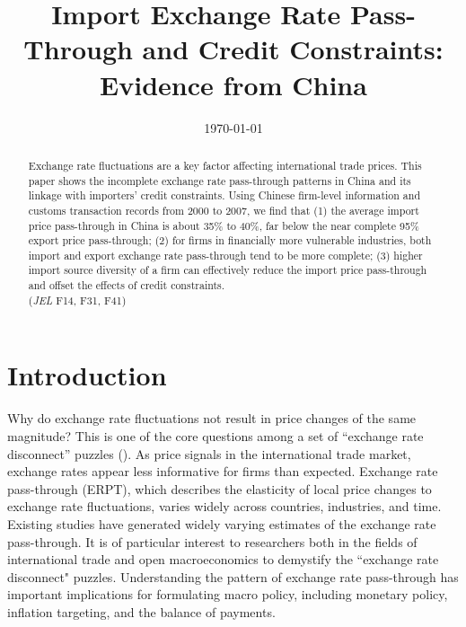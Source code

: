 \documentclass[12pt]{article}
\begin{document}
\title{  \Large \textbf{Import Exchange Rate Pass-Through and Credit Constraints: Evidence from China}}


\date{\today }

\maketitle

\begin{abstract}
Exchange rate fluctuations are a key factor affecting international trade prices. This paper shows the incomplete exchange rate pass-through patterns in China and its linkage with importers' credit constraints. Using Chinese firm-level information and customs transaction records from 2000 to 2007, we find that (1) the average import price pass-through in China is about 35\% to 40\%, far below the near complete 95\% export price pass-through; (2) for firms in financially more vulnerable industries, both import and export exchange rate pass-through tend to be more complete; (3) higher import source diversity of a firm can effectively reduce the import price pass-through and offset the effects of credit constraints.\\
(\textit{JEL} F14, F31, F41)

\end{abstract}

\section{Introduction} \label{Introduction}

Why do exchange rate fluctuations not result in price changes of the same magnitude? This is one of the core questions among a set of ``exchange rate disconnect'' puzzles (\cite{obstfeld2000}). As price signals in the international trade market, exchange rates appear less informative for firms than expected. Exchange rate pass-through (ERPT), which describes the elasticity of local price changes to exchange rate fluctuations, varies widely across countries, industries, and time. Existing studies have generated widely varying estimates of the exchange rate pass-through. It is of particular interest to researchers both in the fields of international trade and open macroeconomics to demystify the ``exchange rate disconnect" puzzles. Understanding the pattern of exchange rate pass-through has important implications for formulating macro policy, including monetary policy, inflation targeting, and the balance of payments.
\end{document}
